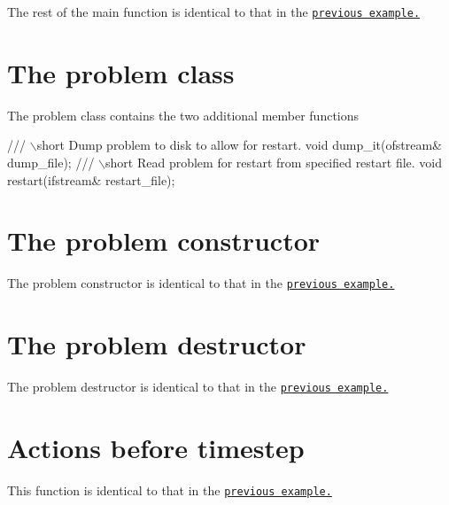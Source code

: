 The rest of the main function is identical to that in the \href{../../two_d_unsteady_heat/html/index.html}{\tt previous example.}



 

\hypertarget{index_problem}{}\section{The problem class}\label{index_problem}
The problem class contains the two additional member functions

 
\begin{DoxyCodeInclude}
 \textcolor{comment}{/// \(\backslash\)short Dump problem to disk to allow for restart.}
 \textcolor{keywordtype}{void} dump\_it(ofstream& dump\_file);
\textcolor{comment}{}
\textcolor{comment}{ /// \(\backslash\)short Read problem for restart from specified restart file.}
\textcolor{comment}{} \textcolor{keywordtype}{void} restart(ifstream& restart\_file);

\end{DoxyCodeInclude}




 

\hypertarget{index_constructor}{}\section{The problem constructor}\label{index_constructor}
The problem constructor is identical to that in the \href{../../two_d_unsteady_heat/html/index.html}{\tt previous example.}



 

\hypertarget{index_destructor}{}\section{The problem destructor}\label{index_destructor}
The problem destructor is identical to that in the \href{../../two_d_unsteady_heat/html/index.html}{\tt previous example.}



 

\hypertarget{index_before_timestep}{}\section{Actions before timestep}\label{index_before_timestep}
This function is identical to that in the \href{../../two_d_unsteady_heat/html/index.html}{\tt previous example.}



